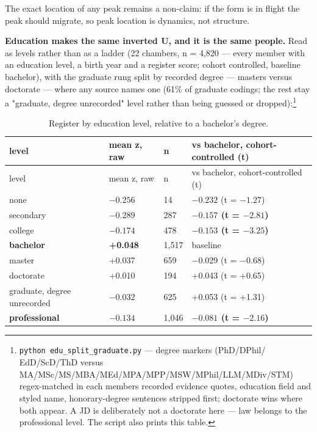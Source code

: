 The exact location of any peak remains a non-claim: if the form is in flight the peak should migrate, so peak location is dynamics, not structure.

\textbf{Education makes the same inverted U, and it is the same people.} Read as
levels rather than as a ladder (22 chambers, n = 4,820 --- every member with
an education level, a birth year and a register score; cohort controlled,
baseline bachelor), with the graduate rung split by recorded degree --- master\textquotesingle s versus
doctorate --- where any source names one (61\% of graduate codings; the rest
stay a "graduate, degree unrecorded" level rather than being guessed or
dropped):\footnote{\texttt{python\ edu\_\allowbreak{}split\_\allowbreak{}graduate.\allowbreak{}py} --- degree markers (PhD/DPhil/
  EdD/ScD/ThD versus MA/MSc/MS/MBA/MEd/MPA/MPP/MSW/MPhil/LLM/MDiv/STM)
  regex-matched in each member\textquotesingle s recorded evidence quotes, education
  field and styled name, honorary-degree sentences stripped first;
  doctorate wins where both appear. A JD is deliberately not a doctorate
  here --- law belongs to the professional level. The script also prints
  this table.}

\begingroup\small
\begin{longtable}[]{@{}llll@{}}
\caption{Register by education level, relative to a bachelor's degree.}\label{tab:education}\\
\toprule\noalign{}
level & mean z, raw & n & vs bachelor, cohort-controlled (t) \\
\midrule\noalign{}
\endfirsthead
\toprule\noalign{}
level & mean z, raw & n & vs bachelor, cohort-controlled (t) \\
\midrule\noalign{}
\endhead
\bottomrule\noalign{}
\endlastfoot
none & \(-0.256\) & 14 & \(-0.232\) (t = \(-1.27\)) \\
secondary & \(-0.289\) & 287 & \textbf{\(-0.157\) (t = \(-2.81\))} \\
college & \(-0.174\) & 478 & \textbf{\(-0.153\) (t = \(-3.25\))} \\
\textbf{bachelor} & \textbf{+0.048} & 1,517 & baseline \\
master & +0.037 & 659 & \(-0.029\) (t = \(-0.68\)) \\
doctorate & +0.010 & 194 & +0.043 (t = +0.65) \\
graduate, degree unrecorded & \(-0.032\) & 625 & +0.053 (t = +1.31) \\
\textbf{professional} & \(-0.134\) & 1,046 & \textbf{\(-0.081\) (t = \(-2.16\))} \\
\end{longtable}
\endgroup


